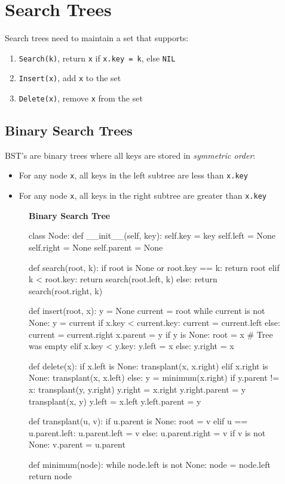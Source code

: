\section{Search Trees}

Search trees need to maintain a set that supports:
\begin{enumerate}
    \item \verb|Search(k)|, return \verb|x| if \verb|x.key = k|, else \verb|NIL|
    \item \verb|Insert(x)|, add \verb|x| to the set
    \item \verb|Delete(x)|, remove \verb|x| from the set
\end{enumerate}

\subsection{Binary Search Trees}
BST's are binary trees where all keys are stored in \emph{symmetric order}:
\begin{itemize}
    \item For any node \verb|x|, all keys in the left subtree are less than \verb|x.key|
    \item For any node \verb|x|, all keys in the right subtree are greater than \verb|x.key|
\end{itemize}

\begin{figure}[h]
\centering \textbf{Binary Search Tree}
\begin{python}
class Node:
    def __init__(self, key):
        self.key = key
        self.left = None
        self.right = None
        self.parent = None

def search(root, k):
    if root is None or root.key == k:
        return root
    elif k < root.key:
        return search(root.left, k)
    else:
        return search(root.right, k)

def insert(root, x):
    y = None
    current = root
    while current is not None:
        y = current
        if x.key < current.key:
            current = current.left
        else:
            current = current.right
    x.parent = y
    if y is None:
        root = x  # Tree was empty
    elif x.key < y.key:
        y.left = x
    else:
        y.right = x

def delete(x):
    if x.left is None:
        transplant(x, x.right)
    elif x.right is None:
        transplant(x, x.left)
    else:
        y = minimum(x.right)
        if y.parent != x:
            transplant(y, y.right)
            y.right = x.right
            y.right.parent = y
        transplant(x, y)
        y.left = x.left
        y.left.parent = y

def transplant(u, v):
    if u.parent is None:
        root = v
    elif u == u.parent.left:
        u.parent.left = v
    else:
        u.parent.right = v
    if v is not None:
        v.parent = u.parent

def minimum(node):
    while node.left is not None:
        node = node.left
    return node
\end{python}
\end{figure}

